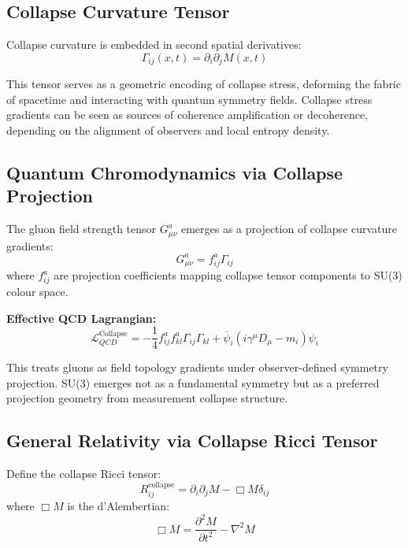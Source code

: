 \subsection{Collapse Curvature Tensor}

Collapse curvature is embedded in second spatial derivatives:
\begin{equation}
\Gamma_{ij}(x,t) = \partial_i \partial_j M(x,t)
\end{equation}

This tensor serves as a geometric encoding of collapse stress, deforming the fabric of spacetime and interacting with quantum symmetry fields. Collapse stress gradients can be seen as sources of coherence amplification or decoherence, depending on the alignment of observers and local entropy density.

\subsection{Quantum Chromodynamics via Collapse Projection}

The gluon field strength tensor $G^a_{\mu\nu}$ emerges as a projection of collapse curvature gradients:
\begin{equation}
G^a_{\mu\nu} = f^a_{ij} \Gamma_{ij}
\end{equation}
where $f^a_{ij}$ are projection coefficients mapping collapse tensor components to SU(3) colour space.

\textbf{Effective QCD Lagrangian:}
\begin{equation}
\mathcal{L}_{QCD}^{\text{Collapse}} = - \frac{1}{4} f^a_{ij} f^{a}_{kl} \Gamma_{ij} \Gamma_{kl} + \bar{\psi}_i (i \gamma^\mu D_\mu - m_i) \psi_i
\end{equation}

This treats gluons as field topology gradients under observer-defined symmetry projection. SU(3) emerges not as a fundamental symmetry but as a preferred projection geometry from measurement collapse structure.

\subsection{General Relativity via Collapse Ricci Tensor}

Define the collapse Ricci tensor:
\begin{equation}
R_{ij}^{\text{collapse}} = \partial_i \partial_j M - \Box M \delta_{ij}
\end{equation}
where $\Box M$ is the d'Alembertian:
\begin{equation}
\Box M = \frac{\partial^2 M}{\partial t^2} - \nabla^2 M
\end{equation}



